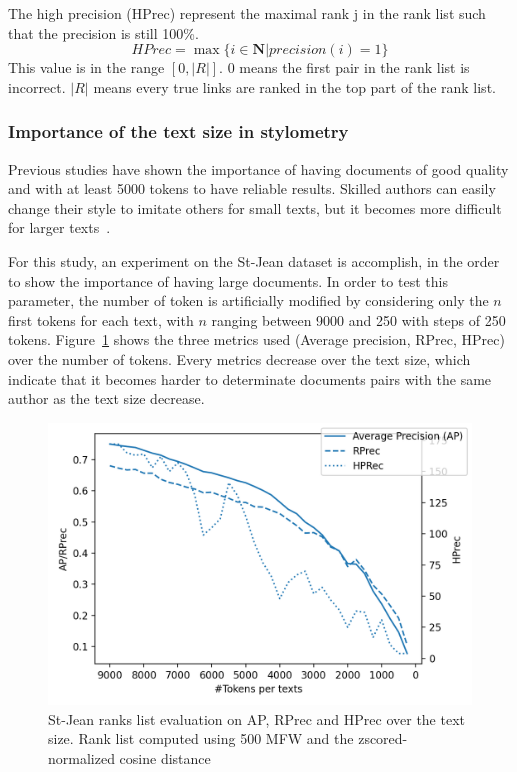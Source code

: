 \begin{definition}
  The high precision (HPrec) represent the maximal rank j in the rank list such that the precision is still 100\%.
  \begin{equation}
    HPrec = \max\{i \in \mathbf{N} | precision(i) = 1\}
  \end{equation}
  This value is in the range $\left[0, |R|\right]$.
  $0$ means the first pair in the rank list is incorrect.
  $|R|$ means every true links are ranked in the top part of the rank list.
\end{definition}

\subsubsection{Importance of the text size in stylometry}

Previous studies have shown the importance of having documents of good quality and with at least 5000 tokens to have reliable results.
Skilled authors can easily change their style to imitate others for small texts, but it becomes more difficult for larger texts~\cite{savoy_stylo}.

For this study, an experiment on the St-Jean dataset is accomplish, in the order to show the importance of having large documents.
In order to test this parameter, the number of token is artificially modified by considering only the $n$ first tokens for each text, with $n$ ranging between 9000 and 250 with steps of 250 tokens.
Figure~\ref{img:degradation} shows the three metrics used (Average precision, RPrec, HPrec) over the number of tokens.
Every metrics decrease over the text size, which indicate that it becomes harder to determinate documents pairs with the same author as the text size decrease.

\begin{figure}
  \centering
  \includegraphics[width=\linewidth]{img/degradation.png}
  \caption{St-Jean ranks list evaluation on AP, RPrec and HPrec over the text size. Rank list computed using 500 MFW and the zscored-normalized cosine distance}
  \label{img:degradation}
\end{figure}

